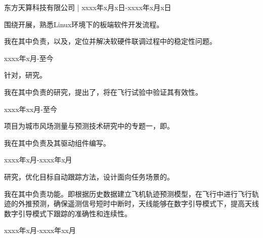 

 \hfill {东方天算科技有限公司 | xxxx年x月x日-xxxx年x月x日}

围绕开展，熟悉Linux环境下的板端软件开发流程。

我在其中负责，以及，定位并解决软硬件联调过程中的稳定性问题。


 \hfill {xxxx年x月-至今}

针对，研究。

我在其中负责的研究，提出了，将在飞行试验中验证其有效性。


\vspace{1em}
 \hfill {xxxx年xx月-至今}

项目为城市风场测量与预测技术研究中的专题一，即。

我在其中负责及其驱动组件编写。


\vspace{1em}
 \hfill {xxxx年x月-xxxx年x月}

研究，优化目标自动跟踪方法，设计面向任务场景的。

我在其中负责功能。即根据历史数据建立飞机轨迹预测模型，在飞行中进行飞行轨迹的外推预测，确保遥测信号短时中断时，天线能够在数字引导模式下，提高天线数字引导模式下跟踪的准确性和连续性。


\vspace{1em}
 \hfill {xxxx年x月-xxxx年xx月}

